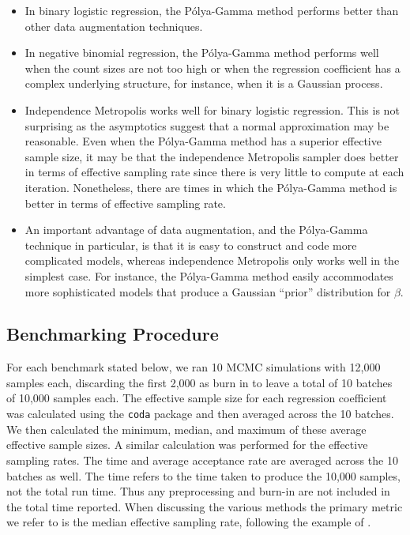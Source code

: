 \documentclass{article}
\newcommand{\Polya}{P\'{o}lya}
\begin{document}
\begin{itemize}

\item In binary logistic regression, the \Polya-Gamma method performs better than
other data augmentation techniques.

\item In negative binomial regression, the \Polya-Gamma method performs well
  when the count sizes are not too high or when the regression coefficient has a
  complex underlying structure, for instance, when it is a Gaussian process.

\item Independence Metropolis works well for binary logistic regression.  This
  is not surprising as the asymptotics suggest that a normal approximation may
  be reasonable.  Even when the \Polya-Gamma method has a superior effective
  sample size, it may be that the independence Metropolis sampler does better in
  terms of effective sampling rate since there is very little to compute at each
  iteration.  Nonetheless, there are times in which the \Polya-Gamma method is
  better in terms of effective sampling rate.

\item An important advantage of data augmentation, and the \Polya-Gamma
  technique in particular, is that it is easy to construct and code more
  complicated models, whereas independence Metropolis only works well in the
  simplest case.  For instance, the \Polya-Gamma method easily accommodates more
  sophisticated models that produce a Gaussian ``prior'' distribution for
  $\beta$.  

\end{itemize}

\subsection{Benchmarking Procedure}

For each benchmark stated below, we ran 10 MCMC simulations with 12,000 samples
each, discarding the first 2,000 as burn in to leave a total of 10 batches of
10,000 samples each.  The effective sample size for each regression coefficient
was calculated using the \texttt{coda} package and then averaged across the 10
batches.  We then calculated the minimum, median, and maximum of these average
effective sample sizes.  A similar calculation was performed for the effective
sampling rates.  The time and average acceptance rate are averaged across the 10
batches as well.  The time refers to the time taken to produce the 10,000
samples, not the total run time.  Thus any preprocessing and burn-in are not
included in the total time reported.  When discussing the various methods the
primary metric we refer to is the median effective sampling rate, following the
example of \cite{fruhwirth-schnatter-fruhwirth-2010}.
\end{document}
